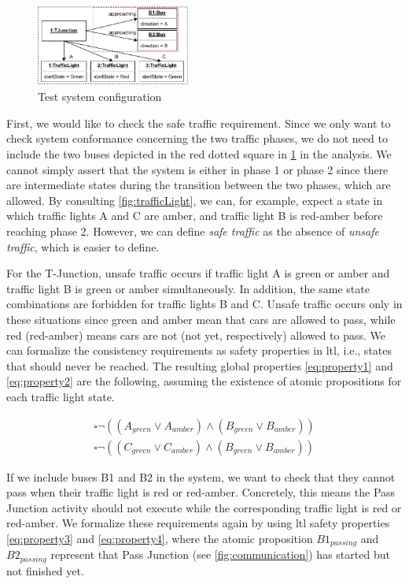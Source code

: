 \documentclass{jot}
\begin{document}
\begin{figure}[h]
    \centering
    \includegraphics[width=0.45\textwidth]{figures/test_config.pdf}
    \caption{Test system configuration}
    \label{fig:test_config}
\end{figure}

First, we would like to check the safe traffic requirement.
Since we only want to check system conformance concerning the two traffic phases, we do not need to include the two buses depicted in the red dotted square in \cref{fig:test_config} in the analysis.
We cannot simply assert that the system is either in phase 1 or phase 2 since there are intermediate states during the transition between the two phases, which are allowed.
By consulting \cref{fig:trafficLight}, we can, for example, expect a state in which traffic lights A and C are amber, and traffic light B is red-amber before reaching phase 2.
However, we can define \textit{safe traffic} as the absence of \textit{unsafe traffic}, which is easier to define.

For the T-Junction, unsafe traffic occurs if traffic light A is green or amber and traffic light B is green or amber simultaneously.
In addition, the same state combinations are forbidden for traffic lights B and C.
Unsafe traffic occurs only in these situations since green and amber mean that cars are allowed to pass, while red (red-amber) means cars are not (not yet, respectively) allowed to pass.
We can formalize the consistency requirements as safety properties in \gls*{ltl}, i.e., states that should never be reached.
The resulting global properties \eqref{eq:property1} and \eqref{eq:property2} are the following, assuming the existence of atomic propositions for each traffic light state. 

\begin{align}
    \square\neg((A_{green} \lor A_{amber}) \land (B_{green} \lor B_{amber})) \label{eq:property1} \\
    \square\neg((C_{green} \lor C_{amber}) \land (B_{green} \lor B_{amber})) \label{eq:property2}
\end{align}

If we include buses \textsf{B1} and \textsf{B2} in the system, we want to check that they cannot pass when their traffic light is red or red-amber.
Concretely, this means the \textsf{Pass Junction} activity should not execute while the corresponding traffic light is \textsf{red} or \textsf{red-amber}.
We formalize these requirements again by using \gls*{ltl} safety properties \eqref{eq:property3} and \eqref{eq:property4}, where the atomic proposition $B1_{passing}$ and $B2_{passing}$ represent that \textsf{Pass Junction} (see \cref{fig:communication}) has started but not finished yet.
\end{document}
